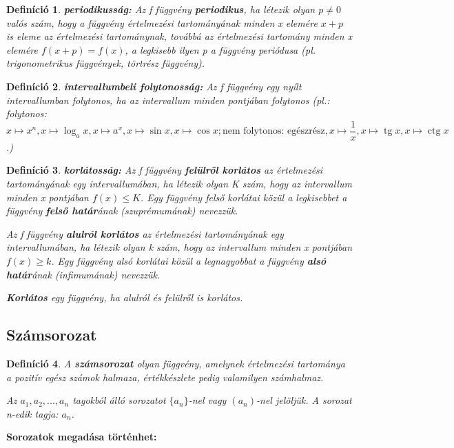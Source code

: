 \documentclass[12pt,a4paper]{article}
\newtheorem{definition}{Definíció} [section]
\DeclareMathOperator{\tg}{tg}
\DeclareMathOperator{\ctg}{ctg}
\begin{document}
\begin{definition}
\textbf{periodikusság:} Az f függvény \textbf{periodikus}, ha létezik olyan $p \neq 0$ valós szám, hogy a függvény értelmezési tartományának minden x elemére $x + p$ is eleme az értelmezési tartománynak, továbbá az értelmezési tartomány minden x elemére $f(x + p) = f(x)$, a legkisebb ilyen p a függvény periódusa (pl. trigonometrikus függvények, törtrész függvény).
\end{definition}

\begin{definition}
\textbf{intervallumbeli folytonosság:} Az f függvény egy nyílt intervallumban folytonos, ha az intervallum minden pontjában folytonos (pl.: folytonos: $x \mapsto x^n, x \mapsto \log_a x, x \mapsto a^x, x \mapsto \sin x, x \mapsto \cos x; \text{nem folytonos: egészrész}, x \mapsto \dfrac{1}{x} , x \mapsto \tg x, x \mapsto \ctg x$.)
\end{definition}

\begin{definition}
\textbf{korlátosság:} Az f függvény \textbf{felülről korlátos} az értelmezési tartományának egy intervallumában, ha létezik olyan K szám, hogy az intervallum minden x pontjában $f(x) \leq K$. Egy függvény felső korlátai közül a legkisebbet a függvény \textbf{felső határ}ának (szuprémumának) nevezzük.

Az f függvény \textbf{alulról korlátos} az értelmezési tartományának egy intervallumában, ha létezik olyan k szám, hogy az intervallum minden x pontjában $f(x) \geq k$. Egy függvény alsó korlátai közül a legnagyobbat a függvény \textbf{alsó határ}ának (infimumának) nevezzük.

\textbf{Korlátos} egy függvény, ha alulról és felülről is korlátos.
\end{definition}

\subsection{Számsorozat}
\begin{definition}
A \textbf{számsorozat} olyan függvény, amelynek értelmezési tartománya a pozitív egész számok halmaza, értékkészlete pedig valamilyen számhalmaz.

Az $a_1, a_2, ..., a_n$ tagokból álló sorozatot $\{a_n\}$-nel vagy $(a_n)$-nel jelöljük. A sorozat n-edik tagja: $a_n$.
\end{definition}

\textbf{Sorozatok megadása történhet:}
\end{document}
